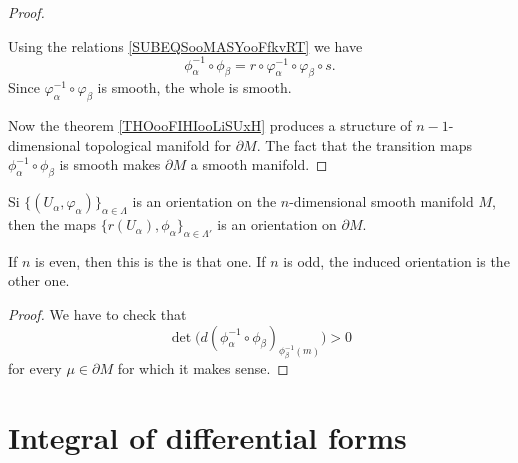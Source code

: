 \begin{proof}
\begin{subproof}
		Using the relations \eqref{SUBEQSooMASYooFfkvRT} we have
		\begin{equation}
			\phi_{\alpha}^{-1}\circ\phi_{\beta}=r\circ \varphi_{\alpha}^{-1}\circ\varphi_{\beta}\circ s.
		\end{equation}
		Since \( \varphi_{\alpha}^{-1}\circ\varphi_{\beta}\) is smooth, the whole is smooth.
	\end{subproof}
	Now the theorem \ref{THOooFIHIooLiSUxH} produces a structure of \( n-1\)-dimensional topological manifold for \( \partial M\). The fact that the transition maps \( \phi_{\alpha}^{-1}\circ\phi_{\beta}\) is smooth makes \( \partial M\) a smooth manifold.
\end{proof}

\begin{theorem}	\label{THOooENBHooOfBTlA}
	Si \( \{ (U_{\alpha}, \varphi_{\alpha}) \}_{\alpha\in \Lambda}\) is an orientation on the \( n\)-dimensional smooth manifold \( M\), then the maps \( \{ r(U_{\alpha}), \phi_{\alpha} \}_{\alpha\in \Lambda'}\) is an orientation on \( \partial M\).

	If \( n\) is even, then this is the  is that one. If \( n\) is odd, the induced orientation is the other one.
\end{theorem}

\begin{proof}
	We have to check that
	\begin{equation}
		\det\big( d(\phi_{\alpha}^{-1}\circ\phi_{\beta})_{\phi^{-1}_{\beta}(m)} \big)>0
	\end{equation}
	for every \( \mu\in\partial M\) for which it makes sense.
\end{proof}


\section{Integral of differential forms}


